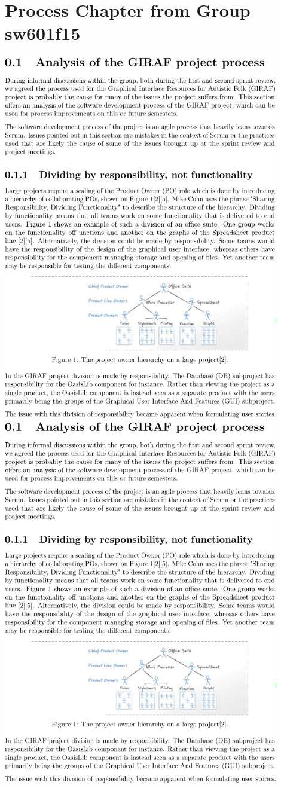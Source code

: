 \chapter{Process Chapter from Group sw601f15}\label{app:601}

\includegraphics[page=1,width=0.9\textwidth]{part_appendix/sw601f15.pdf}\newpage
\includegraphics[page=2,width=0.9\textwidth]{part_appendix/sw601f15.pdf}\newpage
